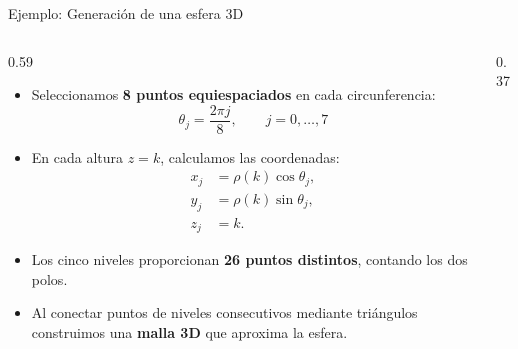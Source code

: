 \documentclass[main.tex]{subfiles}
\begin{document}
\begin{frame}{Ejemplo: Generación de una esfera 3D}
  \small
  \begin{columns}[c,onlytextwidth]
    \begin{column}{0.59\textwidth}
      \begin{itemize}
        \item Seleccionamos \textbf{8 puntos equiespaciados}
              en cada circunferencia:
              \[
                \theta_j=\frac{2\pi j}{8},\qquad j=0,\ldots,7
              \]

        \item En cada altura $z=k$, calculamos las coordenadas:
              \[
                \begin{aligned}
                  x_j &= \rho(k)\cos\theta_j,\\
                  y_j &= \rho(k)\sin\theta_j,\\
                  z_j &= k.
                \end{aligned}
              \]

        \item Los cinco niveles proporcionan \textbf{26 puntos
              distintos}, contando los dos polos.

        \item Al conectar puntos de niveles consecutivos mediante
              triángulos construimos una \textbf{malla 3D} que
              aproxima la esfera.
      \end{itemize}
    \end{column}
    \begin{column}{0.37\textwidth}
      \centering
    \end{column}
  \end{columns}
\end{frame}
\end{document}
